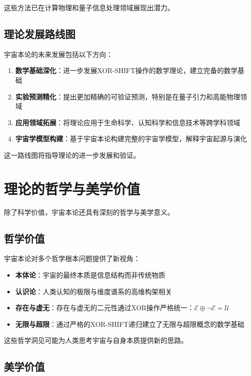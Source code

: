 这些方法已在计算物理和量子信息处理领域展现出潜力。

\subsection{理论发展路线图}

宇宙本论的未来发展包括以下方向：

\begin{enumerate}
  \item \textbf{数学基础深化}：进一步发展XOR-SHIFT操作的数学理论，建立完备的数学基础
  \item \textbf{实验预测精化}：提出更加精确的可验证预测，特别是在量子引力和高能物理领域
  \item \textbf{应用领域拓展}：将理论应用于生命科学、认知科学和信息技术等跨学科领域
  \item \textbf{宇宙学模型构建}：基于宇宙本论构建完整的宇宙学模型，解释宇宙起源与演化
\end{enumerate}

这一路线图将指导理论的进一步发展和验证。

\section{理论的哲学与美学价值}

除了科学价值，宇宙本论还具有深刻的哲学与美学意义。

\subsection{哲学价值}

宇宙本论对多个哲学根本问题提供了新视角：

\begin{itemize}
  \item \textbf{本体论}：宇宙的最终本质是信息结构而非传统物质
  \item \textbf{认识论}：人类认知的极限与维度谱系的高维构架相关
  \item \textbf{存在与虚无}：存在与虚无的二元性通过XOR操作严格统一：$\mathcal{E} \oplus \neg\mathcal{E} = \mathcal{U}$
  \item \textbf{无限与超限}：通过严格的XOR-SHIFT递归建立了无限与超限概念的数学基础
\end{itemize}

这些哲学洞见可能为人类思考宇宙与自身本质提供新的思路。

\subsection{美学价值}

